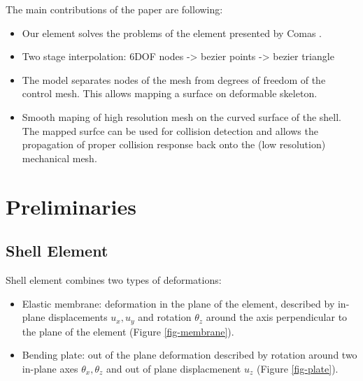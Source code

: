 \documentclass{egpubl}
\begin{document}
The main contributions of the paper are following:
\begin{itemize}
    \item Our element solves the problems of the element presented by Comas
        \cite{Comas2010c}.

    \item Two stage interpolation: 6DOF nodes -> bezier points -> bezier
        triangle

    \item The model separates nodes of the mesh from degrees of freedom of the
        control mesh. This allows mapping a surface on deformable skeleton.

    \item Smooth maping of high resolution mesh on the curved surface of the
        shell. The mapped surfce can be used for collision detection and
        allows the propagation of proper collision response back onto the
        (low resolution) mechanical mesh.

\end{itemize}


\section{Preliminaries} %

\subsection{Shell Element}

Shell element combines two types of deformations:

\begin{itemize}

    \item Elastic membrane: deformation in the plane of the element,
        described by in-plane displacements $u_x, u_y$ and rotation
        $\theta_z$ around the axis perpendicular to the plane of the
        element (Figure \ref{fig-membrane}).

    \item Bending plate: out of the plane deformation described by rotation
        around two in-plane axes $\theta_x, \theta_z$ and out of plane
        displacmenent $u_z$ (Figure \ref{fig-plate}).

\end{itemize}
\end{document}
